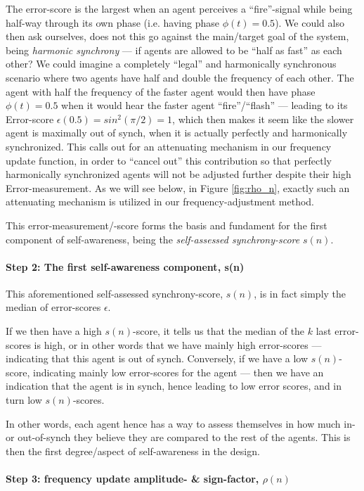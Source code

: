 	The error-score is the largest when an agent perceives a ``fire''-signal while being half-way through its own phase (i.e. having phase $\phi(t)=0.5$). We could also then ask ourselves, does not this go against the main/target goal of the system, being \textit{harmonic synchrony} — if agents are allowed to be ``half as fast'' as each other? We could imagine a completely ``legal'' and harmonically synchronous scenario where two agents have half and double the frequency of each other. The agent with half the frequency of the faster agent would then have phase $\phi(t)=0.5$ when it would hear the faster agent ``fire''/``flash'' — leading to its Error-score $\epsilon(0.5) = sin^2(\pi/2) = 1$, which then makes it seem like the slower agent is maximally out of synch, when it is actually perfectly and harmonically synchronized. This calls out for an attenuating mechanism in our frequency update function, in order to ``cancel out'' this contribution so that perfectly harmonically synchronized agents will not be adjusted further despite their high Error-measurement. As we will see below, in Figure \ref{fig:rho_n}, exactly such an attenuating mechanism is utilized in our frequency-adjustment method.

	This error-measurement/-score forms the basis and fundament for the first component of self-awareness, being the \textit{self-assessed synchrony-score} $s(n)$.


	\paragraph{Step 2: The first self-awareness component, s(n)}
	\label{s_n}
	This aforementioned self-assessed synchrony-score, $s(n)$, is in fact simply the median of error-scores $\epsilon$.

	If we then have a high $s(n)$-score, it tells us that the median of the $k$ last error-scores is high, or in other words that we have mainly high error-scores — indicating that this agent is out of synch. Conversely, if we have a low $s(n)$-score, indicating mainly low error-scores for the agent — then we have an indication that the agent is in synch, hence leading to low error scores, and in turn low $s(n)$-scores. 

	In other words, each agent hence has a way to assess themselves in how much in- or out-of-synch they believe they are compared to the rest of the agents. This is then the first degree/aspect of  self-awareness in the design.

	\paragraph{Step 3: frequency update amplitude- \& sign-factor, $\rho(n)$}

